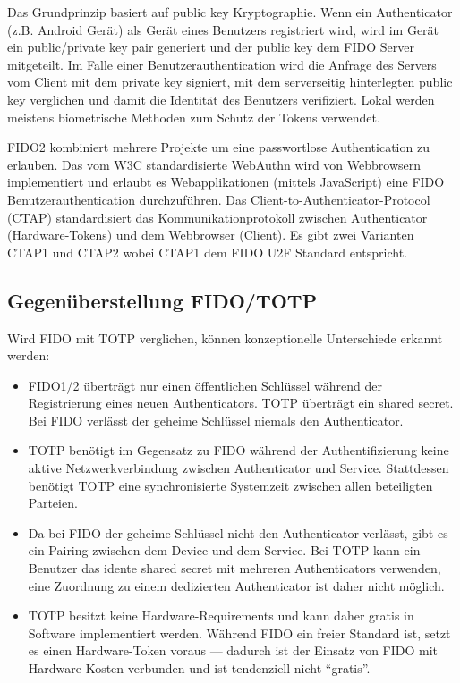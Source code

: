Das Grundprinzip basiert auf public key Kryptographie. Wenn ein Authenticator (z.B. Android Gerät) als Gerät eines Benutzers registriert wird, wird im Gerät ein public/private key pair generiert und der public key dem FIDO Server mitgeteilt. Im Falle einer Benutzerauthentication wird die Anfrage des Servers vom Client mit dem private key signiert, mit dem serverseitig hinterlegten public key verglichen und damit die Identität des Benutzers verifiziert. Lokal werden meistens biometrische Methoden zum Schutz der Tokens verwendet.

FIDO2 kombiniert mehrere Projekte um eine passwortlose Authentication zu erlauben. Das vom W3C standardisierte WebAuthn wird von Webbrowsern implementiert und erlaubt es Webapplikationen (mittels JavaScript) eine FIDO Benutzerauthentication durchzuführen. Das Client-to-Authenticator-Protocol (CTAP) standardisiert das Kommunikationprotokoll zwischen Authenticator (Hardware-Tokens) und dem Webbrowser (Client). Es gibt zwei Varianten CTAP1 und CTAP2 wobei CTAP1 dem FIDO U2F Standard entspricht.

\subsection{Gegenüberstellung FIDO/TOTP}

Wird FIDO mit TOTP verglichen, können konzeptionelle Unterschiede erkannt werden:

\begin{itemize}
	\item FIDO1/2 überträgt nur einen öffentlichen Schlüssel während der Registrierung eines neuen Authenticators. TOTP überträgt ein shared secret. Bei FIDO verlässt der geheime Schlüssel niemals den Authenticator.
	\item TOTP benötigt im Gegensatz zu FIDO während der Authentifizierung keine aktive Netzwerkverbindung zwischen Authenticator und Service. Stattdessen benötigt TOTP eine synchronisierte Systemzeit zwischen allen beteiligten Parteien.
	\item Da bei FIDO der geheime Schlüssel nicht den Authenticator verlässt, gibt es ein Pairing zwischen dem Device und dem Service. Bei TOTP kann ein Benutzer das idente shared secret mit mehreren Authenticators verwenden, eine Zuordnung zu einem dedizierten Authenticator ist daher nicht möglich.
	\item TOTP besitzt keine Hardware-Requirements und kann daher gratis in Software implementiert werden. Während FIDO ein freier Standard ist, setzt es einen Hardware-Token voraus --- dadurch ist der Einsatz von FIDO mit Hardware-Kosten verbunden und ist tendenziell nicht ``gratis''.
\end{itemize}


